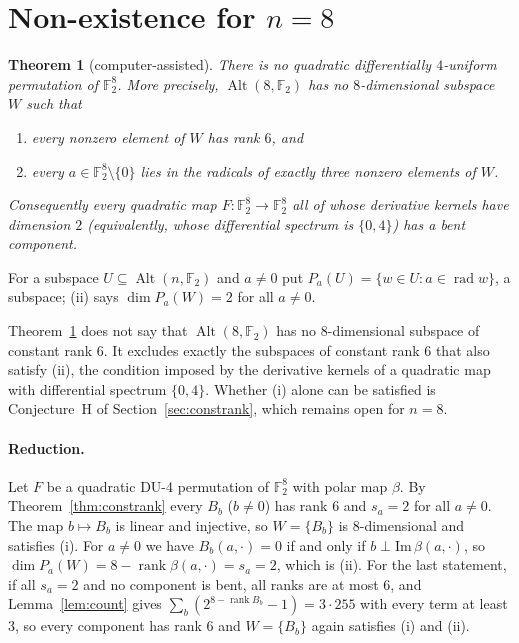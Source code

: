 \documentclass[11pt]{article}
\newtheorem{theorem}{Theorem}
\theoremstyle{definition}
\newcommand{\F}{\mathbb{F}}
\DeclareMathOperator{\Alt}{Alt}
\DeclareMathOperator{\rad}{rad}
\DeclareMathOperator{\rk}{rank}
\begin{document}
\section{Non-existence for \texorpdfstring{$n=8$}{n=8}}\label{sec:n8search}
\begin{theorem}[computer-assisted]\label{thm:n8}
There is no quadratic differentially $4$-uniform permutation of $\F_2^8$. More precisely,
$\Alt(8,\F_2)$ has no $8$-dimensional subspace $W$ such that
\begin{enumerate}
\item[(i)] every nonzero element of $W$ has rank $6$, and
\item[(ii)] every $a\in\F_2^8\setminus\{0\}$ lies in the radicals of exactly three nonzero
elements of $W$.
\end{enumerate}
Consequently every quadratic map $F:\F_2^8\to\F_2^8$ all of whose derivative kernels have
dimension $2$ (equivalently, whose differential spectrum is $\{0,4\}$) has a bent component.
\end{theorem}
For a subspace $U\subseteq\Alt(n,\F_2)$ and $a\neq0$ put $P_a(U)=\{w\in U:a\in\rad w\}$, a
subspace; (ii) says $\dim P_a(W)=2$ for all $a\neq0$.

Theorem~\ref{thm:n8} does not say that $\Alt(8,\F_2)$ has no $8$-dimensional subspace of constant
rank $6$. It excludes exactly the subspaces of constant rank $6$ that also satisfy (ii), the
condition imposed by the derivative kernels of a quadratic map with differential spectrum
$\{0,4\}$. Whether (i) alone can be satisfied is Conjecture~H of Section~\ref{sec:constrank},
which remains open for $n=8$.

\paragraph{Reduction.} Let $F$ be a quadratic DU-4 permutation of $\F_2^8$ with polar map
$\beta$. By Theorem~\ref{thm:constrank} every $B_b$ ($b\neq0$) has rank $6$ and $s_a=2$ for all
$a\neq0$. The map $b\mapsto B_b$ is linear and injective, so $W=\{B_b\}$ is $8$-dimensional and
satisfies (i). For $a\neq0$ we have $B_b(a,\cdot)=0$ if and only if
$b\perp\mathrm{Im}\,\beta(a,\cdot)$, so $\dim P_a(W)=8-\rk\beta(a,\cdot)=s_a=2$, which is (ii).
For the last statement, if all $s_a=2$ and no component is bent, all ranks are at most $6$, and
Lemma~\ref{lem:count} gives $\sum_b(2^{8-\rk B_b}-1)=3\cdot255$ with every term at least $3$, so
every component has rank $6$ and $W=\{B_b\}$ again satisfies (i) and (ii).
\end{document}
